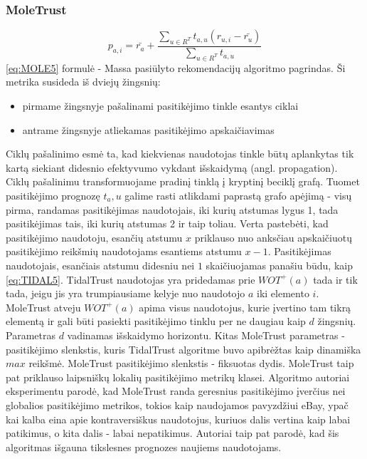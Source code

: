 \documentclass{VUMIFInfMagistrinis}
\begin{document}
\subsubsection{MoleTrust}
\begin{equation}\label{eq:MOLE5}
p_{a,i} = \bar{r_a}+\frac{\sum\limits_{u \in R^T}t_{a,u}(r_{u,i}-\bar{r_u})}{\sum\limits_{u \in R^T} t_{a,u}}
\end{equation}
\eqref{eq:MOLE5} formulė - Massa \cite{11} pasiūlyto rekomendacijų algoritmo pagrindas. Ši metrika susideda iš dviejų žingsnių:
\begin{itemize}
	\item pirmame žingsnyje pašalinami pasitikėjimo tinkle esantys ciklai
	\item antrame žingsnyje atliekamas pasitikėjimo apskaičiavimas
\end{itemize}
Ciklų pašalinimo esmė ta, kad kiekvienas naudotojas tinkle būtų aplankytas tik kartą siekiant didesnio efektyvumo vykdant išskaidymą (angl. propagation).
Ciklų pašalinimu transformuojame pradinį tinklą į kryptinį beciklį grafą. Tuomet pasitikėjimo prognozę $t_a,u$ galime rasti atlikdami paprastą grafo apėjimą - visų pirma, randamas pasitikėjimas naudotojais, iki kurių atstumas lygus 1, tada pasitikėjimas tais, iki kurių atstumas 2 ir taip toliau. Verta pastebėti, kad pasitikėjimo naudotoju, esančių atstumu $x$ priklauso nuo anksčiau apskaičiuotų pasitikėjimo reikšmių naudotojams esantiems atstumu $x-1$.
\newline
\indent
Pasitikėjimas naudotojais, esančiais atstumu didesniu nei $1$ skaičiuojamas panašiu būdu, kaip \eqref{eq:TIDAL5}. TidalTrust naudotojas yra pridedamas prie $WOT^+(a)$ tada ir tik tada, jeigu jis yra trumpiausiame kelyje nuo naudotojo $a$ iki elemento $i$. MoleTrust atveju $WOT^+(a)$ apima visus naudotojus, kurie įvertino tam tikrą elementą ir gali būti pasiekti pasitikėjimo tinklu per ne daugiau kaip $d$ žingsnių. Parametras $d$ vadinamas išskaidymo horizontu. Kitas MoleTrust parametras - pasitikėjimo slenkstis, kuris TidalTrust algoritme buvo apibrėžtas kaip dinamiška $max$ reikšmė. MoleTrust pasitikėjimo slenkstis - fiksuotas dydis. 
\newline
\indent
MoleTrust taip pat priklauso laipsniškų lokalių pasitikėjimo metrikų klasei. Algoritmo autoriai eksperimentu parodė, kad MoleTrust randa geresnius pasitikėjimo įverčius nei globalios pasitikėjimo metrikos, tokios kaip naudojamos pavyzdžiui eBay, ypač kai kalba eina apie kontraversiškus naudotojus, kuriuos dalis vertina kaip labai patikimus, o kita dalis - labai nepatikimus. Autoriai taip pat parodė, kad šis algoritmas išgauna tikslesnes prognozes naujiems naudotojams.
\end{document}
